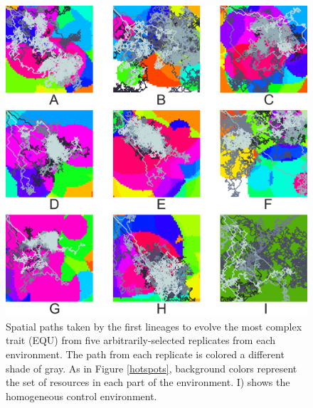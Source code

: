 \documentclass[letterpaper]{article}
\begin{document}
\begin{figure}[t]
\begin{center}
\includegraphics[width=5in]{figs/control_9_paths.png}
\caption{Spatial paths taken by the first lineages to evolve the most complex trait (EQU) from five arbitrarily-selected replicates from each environment. The path from each replicate is colored a different shade of gray. As in Figure \ref{hotspots}, background colors represent the set of resources in each part of the environment. I) shows the homogeneous control environment.}
\label{paths}
\end{center}
\end{figure}
\end{document}
